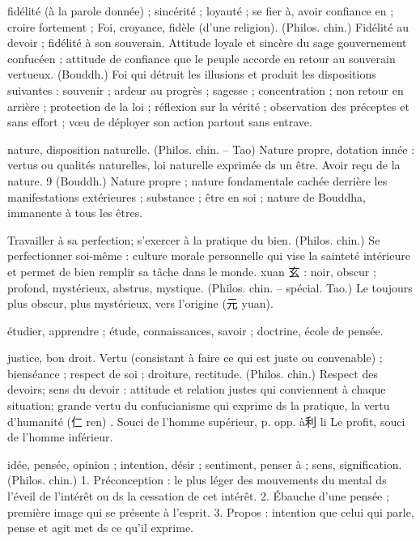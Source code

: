 \begin{Def}[xin信]
   fidélité (à la parole donnée) ; sincérité ; loyauté ; se fier à, avoir confiance en ; croire fortement ; Foi, croyance, fidèle (d’une religion).     (Philos. chin.) Fidélité au devoir ; fidélité à son souverain. Attitude loyale et sincère du sage gouvernement confucéen ; attitude de confiance que le peuple accorde en retour au souverain vertueux.     (Bouddh.) Foi qui détruit les illusions et produit les dispositions suivantes : souvenir ; ardeur au progrès ; sagesse ; concentration ; non retour en arrière ; protection de la loi ; réflexion sur la vérité ; observation des préceptes et sans effort ; vœu de déployer son action partout sans entrave. 
\end{Def}
\begin{Def}[xing 性 ]
    nature, disposition naturelle.     (Philos. chin. – Tao) Nature propre, dotation innée : vertus ou qualités naturelles, loi naturelle exprimée ds un être. Avoir reçu de la nature.  9     (Bouddh.) Nature propre ; nature fondamentale cachée derrière les manifestations extérieures ; substance ; être en soi ; nature de Bouddha, immanente à tous les êtres. 
\end{Def}
\begin{Def}[xiushen 修身]
    Travailler à sa perfection; s’exercer à la pratique du bien. (Philos. chin.) Se perfectionner soi-même : culture morale personnelle qui vise la sainteté intérieure et permet de bien remplir sa tâche dans le monde. xuan 玄 : noir, obscur ; profond, mystérieux, abstrus, mystique. (Philos. chin. – spécial. Tao.) Le toujours plus obscur, plus mystérieux, vers l’origine (元 yuan). 
\end{Def}
\begin{Def}[xue 學]
    étudier, apprendre ; étude, connaissances, savoir ; doctrine, école de pensée.
\end{Def}
\begin{Def}[yi 義]
    justice, bon droit. Vertu (consistant à faire ce qui est juste ou convenable) ; bienséance ; respect de soi ; droiture, rectitude. (Philos. chin.) Respect des devoirs; sens du devoir : attitude et relation justes qui conviennent à chaque situation; grande vertu du confucianisme qui exprime ds la pratique, la vertu d’humanité (仁 ren) . Souci de l’homme supérieur, p. opp. à利 li Le profit, souci de l’homme inférieur. 
\end{Def}
\begin{Def}[yi 意]
    idée, pensée, opinion ; intention, désir ; sentiment, penser à ; sens, signification. (Philos. chin.) 1. Préconception : le plus léger des mouvements du mental ds l’éveil de l’intérêt ou ds la cessation de cet intérêt. 2. Ébauche d’une pensée ; première image qui se présente à l’esprit. 3. Propos : intention que celui qui parle, pense et agit met ds ce qu’il exprime. 
\end{Def}
